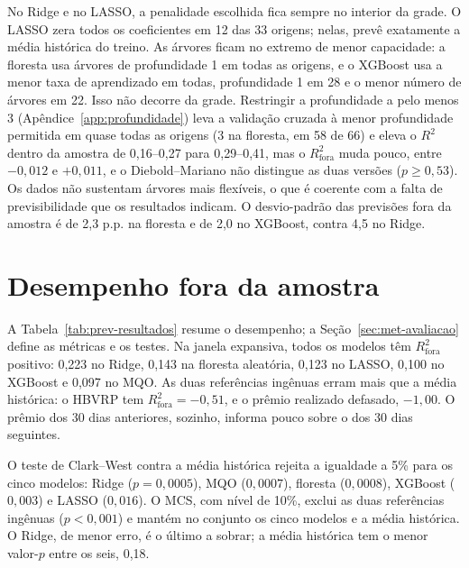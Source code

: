 No Ridge e no LASSO, a penalidade escolhida fica sempre no interior da grade. O
LASSO zera todos os coeficientes em 12 das 33 origens; nelas, prevê
exatamente a média histórica do treino. As árvores ficam no extremo de menor
capacidade: a floresta usa árvores de profundidade 1 em todas as origens, e o
XGBoost usa a menor taxa de aprendizado em todas, profundidade 1 em 28 e o
menor número de árvores em 22. Isso não decorre da grade. Restringir a
profundidade a pelo menos 3 (Apêndice~\ref{app:profundidade}) leva a validação
cruzada à menor profundidade permitida em quase todas as origens (3 na
floresta, em 58 de 66) e eleva o $R^2$ dentro da amostra de 0,16--0,27 para
0,29--0,41, mas o $R^2_{\text{fora}}$ muda pouco, entre $-0{,}012$ e
$+0{,}011$, e o Diebold--Mariano não distingue as duas versões
($p \ge 0{,}53$). Os dados não sustentam árvores mais flexíveis, o que é
coerente com a falta de previsibilidade que os resultados indicam. O
desvio-padrão das previsões fora da amostra é de 2,3 p.p. na floresta e de 2,0
no XGBoost, contra 4,5 no Ridge.



\section{Desempenho fora da amostra}
\label{sec:prev-resultados}

A Tabela~\ref{tab:prev-resultados} resume o desempenho; a
Seção~\ref{sec:met-avaliacao} define as métricas e os testes. Na janela
expansiva, todos os modelos têm $R^2_{\text{fora}}$ positivo: 0,223 no Ridge,
0,143 na floresta aleatória, 0,123 no LASSO, 0,100 no XGBoost e 0,097 no MQO.
As duas referências ingênuas erram mais que a média histórica: o HBVRP tem
$R^2_{\text{fora}} = -0{,}51$, e o prêmio realizado defasado, $-1{,}00$. O
prêmio dos 30 dias anteriores, sozinho, informa pouco sobre o dos 30 dias
seguintes.



O teste de Clark--West contra a média histórica rejeita a igualdade a 5\% para
os cinco modelos: Ridge ($p = 0{,}0005$), MQO ($0{,}0007$), floresta
($0{,}0008$), XGBoost ($0{,}003$) e LASSO ($0{,}016$). O MCS, com nível de
10\%, exclui as duas referências ingênuas ($p < 0{,}001$) e mantém no conjunto
os cinco modelos e a média histórica. O Ridge, de menor erro, é o último a
sobrar; a média histórica tem o menor valor-$p$ entre os seis, 0,18.


